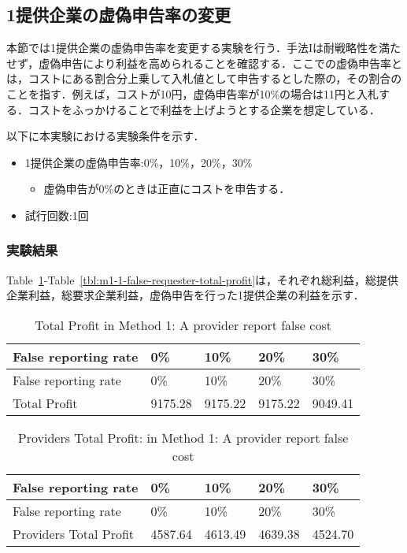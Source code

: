 \hypertarget{ux63d0ux4f9bux4f01ux696dux306eux865aux507dux7533ux544aux7387ux306eux5909ux66f4}{%
\subsection{1提供企業の虚偽申告率の変更}\label{ux63d0ux4f9bux4f01ux696dux306eux865aux507dux7533ux544aux7387ux306eux5909ux66f4}}

本節では1提供企業の虚偽申告率を変更する実験を行う．手法Iは耐戦略性を満たせず，虚偽申告により利益を高められることを確認する．ここでの虚偽申告率とは，コストにある割合分上乗して入札値として申告するとした際の，その割合のことを指す．例えば，コストが10円，虚偽申告率が10\%の場合は11円と入札する．コストをふっかけることで利益を上げようとする企業を想定している．

以下に本実験における実験条件を示す．

\begin{itemize}
\tightlist
\item
  1提供企業の虚偽申告率:0\%，10\%，20\%，30\%

  \begin{itemize}
  \tightlist
  \item
    虚偽申告が0\%のときは正直にコストを申告する．
  \end{itemize}
\item
  試行回数:1回
\end{itemize}

\hypertarget{ux5b9fux9a13ux7d50ux679c}{%
\subsubsection{実験結果}\label{ux5b9fux9a13ux7d50ux679c}}

Table~\ref{tbl:m1-1-total-profit}-Table~\ref{tbl:m1-1-false-requester-total-profit}は，それぞれ総利益，総提供企業利益，総要求企業利益，虚偽申告を行った1提供企業の利益を示す．

\hypertarget{tbl:m1-1-total-profit}{}
\begin{longtable}[H]{@{}lllll@{}}
\caption{\label{tbl:m1-1-total-profit}Total Profit in Method 1: A
provider report false cost}\tabularnewline
\toprule
False reporting rate & 0\% & 10\% & 20\% & 30\%\tabularnewline
\midrule
\endfirsthead
\toprule
False reporting rate & 0\% & 10\% & 20\% & 30\%\tabularnewline
\midrule
\endhead
Total Profit & 9175.28 & 9175.22 & 9175.22 & 9049.41\tabularnewline
\bottomrule
\end{longtable}

\hypertarget{tbl:m1-1-providers-total-profit}{}
\begin{longtable}[H]{@{}lllll@{}}
\caption{\label{tbl:m1-1-providers-total-profit}Providers Total Profit:
in Method 1: A provider report false cost}\tabularnewline
\toprule
False reporting rate & 0\% & 10\% & 20\% & 30\%\tabularnewline
\midrule
\endfirsthead
\toprule
False reporting rate & 0\% & 10\% & 20\% & 30\%\tabularnewline
\midrule
\endhead
Providers Total Profit & 4587.64 & 4613.49 & 4639.38 &
4524.70\tabularnewline
\bottomrule
\end{longtable}

